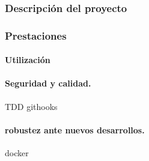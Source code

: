 \subsubsection{Descripción del proyecto}
    
\subsubsection{Prestaciones}

\paragraph{Utilización}

\paragraph{Seguridad y calidad.}
TDD
githooks
\paragraph{robustez ante nuevos desarrollos.}
docker



